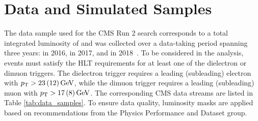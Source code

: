 \chapter{Data and Simulated Samples}\label{sec:data}

The data sample used for the CMS Run 2 \hzg{} search corresponds to a total integrated luminosity of \LumiT\fbinv and was collected over a data-taking period spanning three years: \Lumia\fbinv in 2016, \Lumib\fbinv in 2017, and \Lumic\fbinv in 2018~\cite{CMS-LUM-17-003,LUM-17-004,LUM-18-002}. 
To be considered in the analysis, events must satisfy the HLT requirements for at least one of the dielectron or dimuon triggers.
The dielectron trigger requires a leading (subleading) electron with
$p_{\mathrm{T}} > 23\,(12)\,\text{Ge\hspace{-.08em}V}$, while the dimuon trigger requires a leading (subleading) muon with $p_{\mathrm{T}} > 17\,(8)\,\text{Ge\hspace{-.08em}V}$.
The corresponding CMS data streams are listed in Table \ref{tab:data_samples}. 
To ensure data quality, luminosity masks are applied based on recommendations from the Physics Performance and Dataset group.

